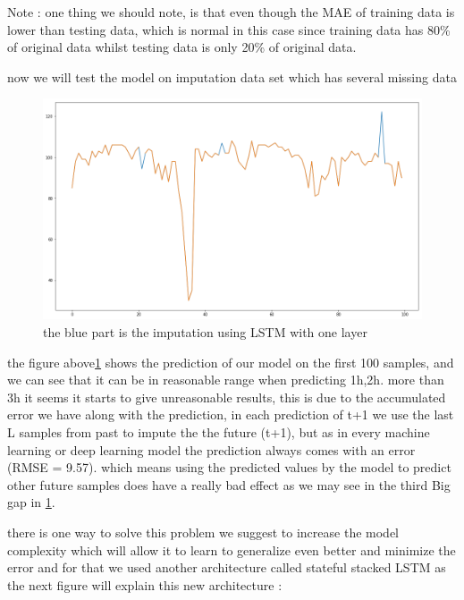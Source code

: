 Note : one thing we should note, is that even though the MAE of training data is lower than testing data, which is normal in this case  since training data has 80\%  of original data whilst testing data is only 20\% of original data.

now we will test the model on imputation data set which has  several missing data 

\begin{figure}[h]
\centering
\includegraphics[scale=.32]{img/merge_best_of_result.png}  
\caption{the blue part is the imputation using  LSTM with one layer}
\label{fig:first_imp}
\end{figure}

the figure above\ref{fig:first_imp} shows the prediction of our model on the first 100 samples, and we can see that it can be in reasonable range when predicting 1h,2h. more than 3h it seems it starts to give unreasonable results, this is due to the accumulated error we have along with the prediction, in each prediction of t+1 we use the last L samples from past to impute the the future (t+1), but as in every machine learning or deep learning model the prediction always comes with an error (RMSE = 9.57). which means using the predicted values by the model to predict other future samples does have a really bad effect as we may see in the third Big gap in \ref{fig:first_imp}.

there is one way to solve this problem we suggest to increase the model complexity which will allow it to learn to generalize even better and minimize the error and for that we used another architecture  called  stateful stacked LSTM as the next figure will explain this new architecture :

